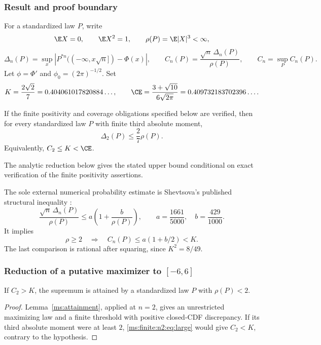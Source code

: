 \subsubsection{Result and proof boundary}
For a standardized law $P$, write
\[
 \E X=0,\qquad \E X^2=1,\qquad \rho(P)=\E|X|^3<\infty,
\]
\[
 \Delta_n(P)=\sup_x\left|P^{*n}(( -\infty,x\sqrt n])-\Phi(x)\right|,
 \qquad C_n(P)=\frac{\sqrt n\,\Delta_n(P)}{\rho(P)},\qquad C_n=\sup_P C_n(P).
\]
Let $\phi=\Phi'$ and $\phi_0=(2\pi)^{-1/2}$. Set
\[
 K=\frac{2\sqrt2}{7}=0.404061017820884\ldots,
 \qquad \CE=\frac{3+\sqrt{10}}{6\sqrt{2\pi}}=0.409732183702396\ldots.
\]
\begin{theorem}\label{ms:finite:n2:thm:main}
If the finite positivity and coverage obligations specified below are
verified, then for every standardized law $P$ with finite third absolute moment,
\[
 \boxed{\Delta_2(P)\le\frac27\rho(P).}
\]
Equivalently, $C_2\le K<\CE$.
\end{theorem}
The analytic reduction below gives the stated upper bound conditional on
exact verification of the finite positivity assertions.

The sole external numerical probability estimate is Shevtsova's published
structural inequality \cite{Shevtsova2013}:
\begin{equation}\label{ms:finite:n2:eq:struct}
 \frac{\sqrt n\,\Delta_n(P)}{\rho(P)}
 \le a\left(1+\frac b{\rho(P)}\right),
 \qquad a=\frac{1661}{5000},\quad b=\frac{429}{1000}.
\end{equation}
It implies
\begin{equation}\label{ms:finite:n2:eq:large}
 \rho\ge2\quad\Longrightarrow\quad
 C_n(P)\le a(1+b/2)<K.
\end{equation}
The last comparison is rational after squaring, since $K^2=8/49$.

\subsubsection{Reduction of a putative maximizer to \texorpdfstring{$[-6,6]$}{[-6,6]}}
\begin{lemma}\label{ms:finite:n2:lem:attain}
If $C_2>K$, the supremum is attained by a standardized law $P$ with $\rho(P)<2$.
\end{lemma}
\begin{proof}
Lemma~\ref{ms:attainment}, applied at $n=2$, gives an unrestricted
maximizing law and a finite threshold with positive closed-CDF discrepancy. If its third
absolute moment were at least $2$, \eqref{ms:finite:n2:eq:large}
would give $C_2<K$, contrary to the hypothesis.
\end{proof}

